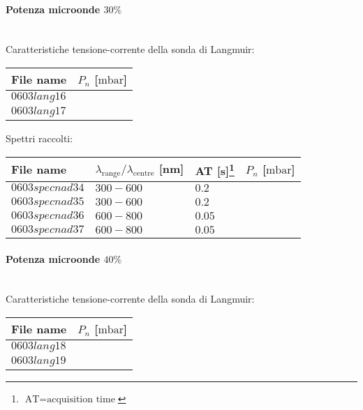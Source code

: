 \paragraph*{Potenza microonde $\text{30\%}$} ~\\
Caratteristiche tensione-corrente della sonda di Langmuir:
\begin{center}
  \begin{tabular}{p{3cm}p{3cm}}
  \toprule
File name	&$P_{n}$ [$\si{\milli\bar}$]\\
  \midrule
$0603lang16$	&$  $\\
$0603lang17$	&$  $\\

  \bottomrule
  \end{tabular}
\end{center}

Spettri raccolti:
\begin{center}
\begin{tabular}{p{3cm}p{4cm}p{2cm}p{3cm}}
\toprule
File name	&$\lambda_\text{range}\text{/}\lambda_\text{centre}$ [nm] &AT [s]\footnote{$\text{AT}=\text{acquisition time}$} &$P_{n}$ [$\si{\milli\bar}$]\\
\midrule
$0603specnad34$	&$300-600$	&$0.2$		&$  $\\
$0603specnad35$	&$300-600$	&$0.2$		&$  $\\
$0603specnad36$	&$600-800$	&$0.05$		&$  $\\
$0603specnad37$	&$600-800$	&$0.05$		&$  $\\


\bottomrule
\end{tabular}
\end{center}

\paragraph*{Potenza microonde $\text{40\%}$} ~\\
Caratteristiche tensione-corrente della sonda di Langmuir:
\begin{center}
\begin{tabular}{p{3cm}p{3cm}}
\toprule
File name	&$P_n$ [$\si{\milli\bar}$]\\
\midrule
$0603lang18$	&$  $\\
$0603lang19$	&$  $\\
\bottomrule
\end{tabular}
\end{center}

